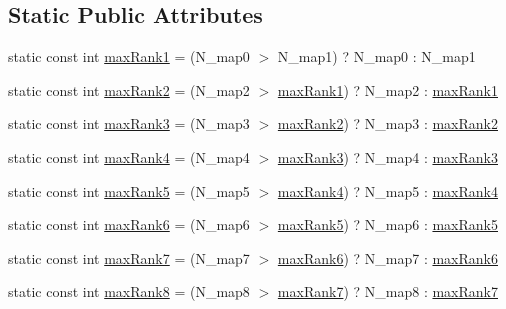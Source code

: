 \subsection*{Static Public Attributes}
\begin{DoxyCompactItemize}
\item 
static const int \hyperlink{classArrayIndexMapping_a35fc152e880b974b4fa28d587d7435ec}{max\+Rank1} = (N\+\_\+map0 $>$ N\+\_\+map1) ? N\+\_\+map0 \+: N\+\_\+map1
\item 
static const int \hyperlink{classArrayIndexMapping_a5966d8b9bfafddd6f4541b45548d7620}{max\+Rank2} = (N\+\_\+map2 $>$ \hyperlink{classArrayIndexMapping_a35fc152e880b974b4fa28d587d7435ec}{max\+Rank1}) ? N\+\_\+map2 \+: \hyperlink{classArrayIndexMapping_a35fc152e880b974b4fa28d587d7435ec}{max\+Rank1}
\item 
static const int \hyperlink{classArrayIndexMapping_ae8774956b8f4a23da006bca9db0ffbbf}{max\+Rank3} = (N\+\_\+map3 $>$ \hyperlink{classArrayIndexMapping_a5966d8b9bfafddd6f4541b45548d7620}{max\+Rank2}) ? N\+\_\+map3 \+: \hyperlink{classArrayIndexMapping_a5966d8b9bfafddd6f4541b45548d7620}{max\+Rank2}
\item 
static const int \hyperlink{classArrayIndexMapping_a7bd141f55526934737e4903226ce767c}{max\+Rank4} = (N\+\_\+map4 $>$ \hyperlink{classArrayIndexMapping_ae8774956b8f4a23da006bca9db0ffbbf}{max\+Rank3}) ? N\+\_\+map4 \+: \hyperlink{classArrayIndexMapping_ae8774956b8f4a23da006bca9db0ffbbf}{max\+Rank3}
\item 
static const int \hyperlink{classArrayIndexMapping_a4b9450766582f18fe4117e077f823f08}{max\+Rank5} = (N\+\_\+map5 $>$ \hyperlink{classArrayIndexMapping_a7bd141f55526934737e4903226ce767c}{max\+Rank4}) ? N\+\_\+map5 \+: \hyperlink{classArrayIndexMapping_a7bd141f55526934737e4903226ce767c}{max\+Rank4}
\item 
static const int \hyperlink{classArrayIndexMapping_a9f827f21ccc242766fb687e0dde03d3f}{max\+Rank6} = (N\+\_\+map6 $>$ \hyperlink{classArrayIndexMapping_a4b9450766582f18fe4117e077f823f08}{max\+Rank5}) ? N\+\_\+map6 \+: \hyperlink{classArrayIndexMapping_a4b9450766582f18fe4117e077f823f08}{max\+Rank5}
\item 
static const int \hyperlink{classArrayIndexMapping_a70f6fd5b6e8e23248487b7fb047bd494}{max\+Rank7} = (N\+\_\+map7 $>$ \hyperlink{classArrayIndexMapping_a9f827f21ccc242766fb687e0dde03d3f}{max\+Rank6}) ? N\+\_\+map7 \+: \hyperlink{classArrayIndexMapping_a9f827f21ccc242766fb687e0dde03d3f}{max\+Rank6}
\item 
static const int \hyperlink{classArrayIndexMapping_a7fb0f9f1c04d24e03d050b60d29a5c68}{max\+Rank8} = (N\+\_\+map8 $>$ \hyperlink{classArrayIndexMapping_a70f6fd5b6e8e23248487b7fb047bd494}{max\+Rank7}) ? N\+\_\+map8 \+: \hyperlink{classArrayIndexMapping_a70f6fd5b6e8e23248487b7fb047bd494}{max\+Rank7}

\end{DoxyCompactItemize}
